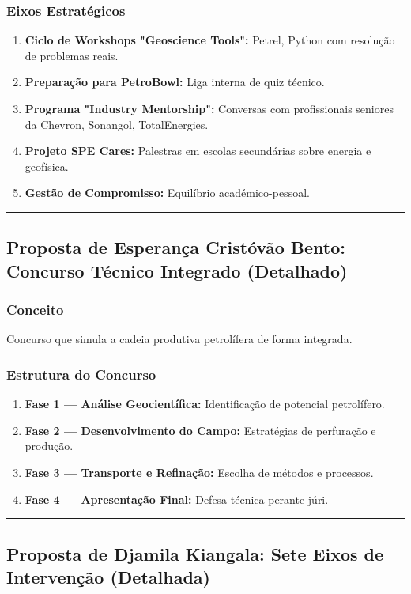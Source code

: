 \documentclass[12pt,a4paper]{article}
\newcommand{\proposalsep}{%
  \vspace{6pt}%
  {\color{gold}\rule{0.35\linewidth}{0.7pt}}%
  \vspace{4pt}%
}
\begin{document}
\subsubsection*{Eixos Estratégicos}
\begin{enumerate}
    \item \textbf{Ciclo de Workshops "Geoscience Tools":} Petrel, Python com resolução de problemas reais.
    \item \textbf{Preparação para PetroBowl:} Liga interna de quiz técnico.
    \item \textbf{Programa "Industry Mentorship":} Conversas com profissionais seniores da Chevron, Sonangol, TotalEnergies.
    \item \textbf{Projeto SPE Cares:} Palestras em escolas secundárias sobre energia e geofísica.
    \item \textbf{Gestão de Compromisso:} Equilíbrio académico-pessoal.
\end{enumerate}

\proposalsep

\subsection{Proposta de Esperança Cristóvão Bento: Concurso Técnico Integrado (Detalhado)}

\subsubsection*{Conceito}
Concurso que simula a cadeia produtiva petrolífera de forma integrada.

\subsubsection*{Estrutura do Concurso}
\begin{enumerate}
    \item \textbf{Fase 1 — Análise Geocientífica:} Identificação de potencial petrolífero.
    \item \textbf{Fase 2 — Desenvolvimento do Campo:} Estratégias de perfuração e produção.
    \item \textbf{Fase 3 — Transporte e Refinação:} Escolha de métodos e processos.
    \item \textbf{Fase 4 — Apresentação Final:} Defesa técnica perante júri.
\end{enumerate}

\proposalsep

\subsection{Proposta de Djamila Kiangala: Sete Eixos de Intervenção (Detalhada)}
\end{document}
